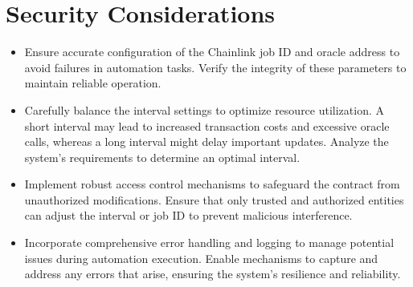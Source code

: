 \documentclass[a4paper,10pt,english]{sphinxmanual}
\begin{document}
\section{Security Considerations}
\label{\detokenize{docs_chainlink_automation_contract:security-considerations}}\begin{itemize}
\item {} 
\sphinxAtStartPar
{}
\sphinxhyphen{} Ensure accurate configuration of the Chainlink job ID and oracle address to avoid failures in automation tasks. Verify the integrity of these parameters to maintain reliable operation.

\item {} 
\sphinxAtStartPar
{}
\sphinxhyphen{} Carefully balance the interval settings to optimize resource utilization. A short interval may lead to increased transaction costs and excessive oracle calls, whereas a long interval might delay important updates. Analyze the system’s requirements to determine an optimal interval.

\item {} 
\sphinxAtStartPar
{}
\sphinxhyphen{} Implement robust access control mechanisms to safeguard the contract from unauthorized modifications. Ensure that only trusted and authorized entities can adjust the interval or job ID to prevent malicious interference.

\item {} 
\sphinxAtStartPar
{}
\sphinxhyphen{} Incorporate comprehensive error handling and logging to manage potential issues during automation execution. Enable mechanisms to capture and address any errors that arise, ensuring the system’s resilience and reliability.

\end{itemize}
\end{document}
